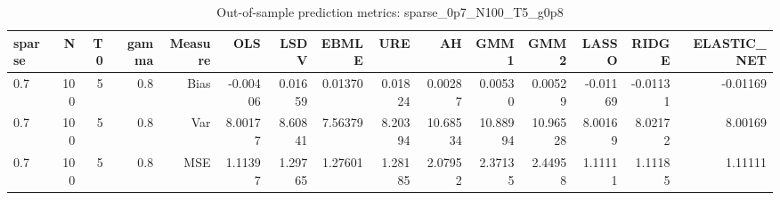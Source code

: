 \begin{table}[!htbp]\centering
\caption{Out-of-sample prediction metrics: sparse_0p7_N100_T5_g0p8}
\label{tab:table3_sparse_0p7_N100_T5_g0p8}
\begin{tabular}{lrrrrrrrrrrrrrr}
\hline
sparse & N & T0 & gamma & Measure & OLS & LSDV & EBMLE & URE & AH & GMM1 & GMM2 & LASSO & RIDGE & ELASTIC_NET \\
\hline
0.7 & 100 & 5 & 0.8 & Bias & -0.00406 & 0.01659 & 0.01370 & 0.01824 & 0.00287 & 0.00530 & 0.00529 & -0.01169 & -0.01131 & -0.01169 \\
0.7 & 100 & 5 & 0.8 & Var & 8.00177 & 8.60841 & 7.56379 & 8.20394 & 10.68534 & 10.88994 & 10.96528 & 8.00169 & 8.02172 & 8.00169 \\
0.7 & 100 & 5 & 0.8 & MSE & 1.11397 & 1.29765 & 1.27601 & 1.28185 & 2.07952 & 2.37135 & 2.44958 & 1.11111 & 1.11185 & 1.11111 \\
\hline
\end{tabular}
\end{table}

